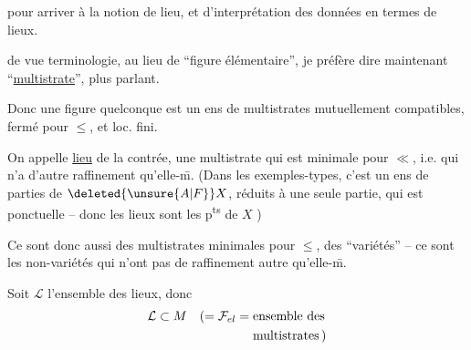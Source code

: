 pour arriver à la notion de lieu, et d'interprétation des données en termes de lieux.

 de vue terminologie, au lieu de ``figure élémentaire'', je préfère dire maintenant ``\uline{multistrate}'', plus parlant.

Donc une figure quelconque est un ens de multistrates mutuellement compatibles, fermé pour $\leq$, et loc. fini.

 On appelle  \uline{lieu} de la contrée, une multistrate qui est minimale pour $\ll$, i.e. qui n'a d'autre raffinement qu'elle-\={m}.     (Dans les exemples-types, c'est un ens de parties de $\deleted{\unsure{A|F}}X$, réduits à une seule partie, qui est ponctuelle -- donc les lieux sont les p\textsuperscript{ts} de $X$ )

Ce sont donc aussi des multistrates minimales pour $\leq$,   des ``variétés''  -- ce sont les non-variétés  qui n'ont pas de raffinement autre qu'elle-\={m}.

Soit $\mathcal{L}$ l'ensemble des lieux,  donc
\[
\begin{aligned}
\mathcal{L}\subset M\quad (={}&\mathcal{F}_{el}=\text{ensemble des}\\
&\hphantom{\mathcal{F}_{el}={}}\text{multistrates}\,)
\end{aligned}
\]
